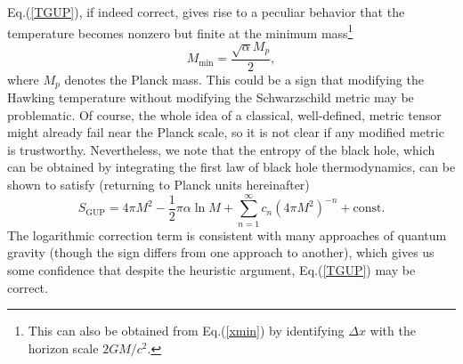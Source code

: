 \documentclass[12pt,preprintnumbers, floatfix, preprintnumbers, letterpaper, superscriptaddress,nofootinbib]{revtex4-2}
\begin{document}
Eq.(\ref{TGUP}), if indeed correct, gives rise to a peculiar behavior that the temperature becomes nonzero but finite at the minimum mass\footnote{This can also be obtained from Eq.(\ref{xmin}) by identifying $\Delta x$ with the horizon scale $2GM/c^2$.} 
\begin{equation}\label{Mmin}
M_\text{min}=\frac{\sqrt{\alpha}M_p}{2}, 
\end{equation}
where $M_p$ denotes the Planck mass. This could be a sign that modifying the Hawking temperature without modifying the Schwarzschild metric may be problematic. Of course, the whole idea of a classical, well-defined, metric tensor might already fail near the Planck scale, so it is not clear if any modified metric is trustworthy. Nevertheless, we note that the entropy of the black hole, which can be obtained by integrating the first law of black hole thermodynamics, can be shown to satisfy (returning to Planck units hereinafter)
\begin{equation}\label{SGUP}
S_\text{GUP} = 4\pi M^2 - \frac{1}{2}\pi \alpha \ln M + \sum_{n=1}^\infty c_n (4\pi M^2)^{-n} + \text{const.}
\end{equation}
The logarithmic correction term is consistent with many approaches of quantum gravity (though the sign differs from one approach to another), which gives us some confidence that despite the heuristic argument, Eq.(\ref{TGUP}) may be correct.
\end{document}
